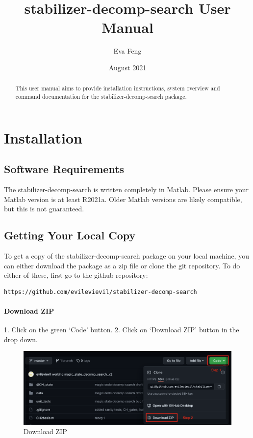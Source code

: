 \documentclass[11pt]{article}
\title{stabilizer-decomp-search User Manual}
\author{
Eva Feng 
}
\date{August 2021}
\begin{document}
\maketitle

\vspace{-15pt}

\begin{abstract}
This user manual aims to provide installation instructions, system overview and command documentation for the stabilizer-decomp-search package. 

\end{abstract}
\section{Installation}\label{sec:install}

\subsection{Software Requirements}
The stabilizer-decomp-search is written completely in Matlab. Please ensure your Matlab version is at least R2021a. Older Matlab versions are likely compatible, but this is not guaranteed. 

\subsection{Getting Your Local Copy}
To get a copy of the stabilizer-decomp-search package on your local machine, you can either download the package as a zip file or clone the git repository. To do either of these, first go to the github repository:

\begin{verbatim}
https://github.com/evilevievil/stabilizer-decomp-search
\end{verbatim}

\paragraph*{Download ZIP}
1. Click on the green `Code' button. 
2. Click on `Download ZIP' button in the drop down.
\begin{figure}
            \includegraphics[height=0.25\textheight]{download}
            \caption{Download ZIP}
\end{figure}
\end{document}
